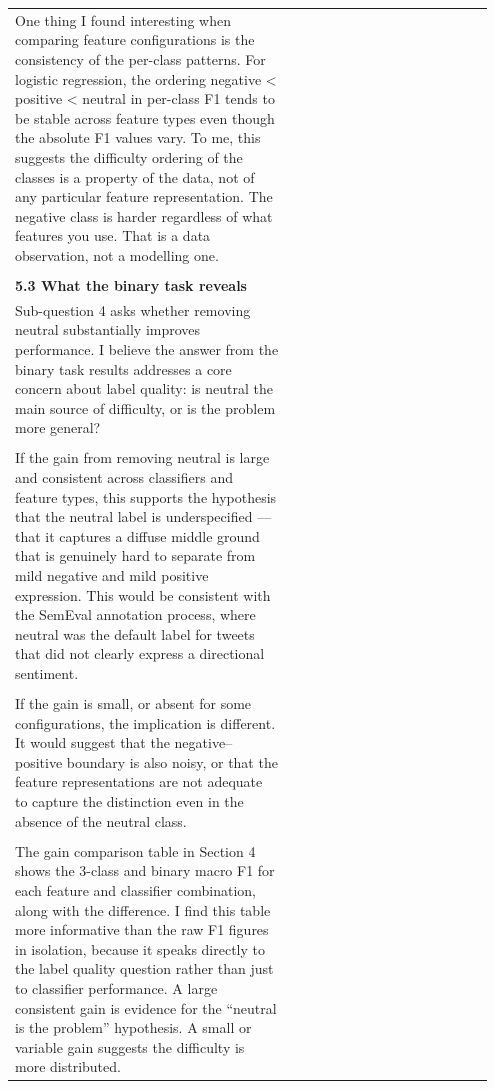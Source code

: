 \documentclass[11pt]{article}
\begin{document}
\begin{longtable}{|p{0.55\linewidth}|p{0.40\linewidth}|}
\hline
\rule{0pt}{3.5cm} & \\
\hline
One thing I found interesting when comparing feature configurations is the consistency of the per-class patterns. For logistic regression, the ordering negative < positive < neutral in per-class F1 tends to be stable across feature types even though the absolute F1 values vary. To me, this suggests the difficulty ordering of the classes is a property of the data, not of any particular feature representation. The negative class is harder regardless of what features you use. That is a data observation, not a modelling one. & \\[2pt]
\hline
\rule{0pt}{3.5cm} & \\
\hline
\multicolumn{2}{|l|}{\textbf{5.3 What the binary task reveals}} \\[2pt]
\hline
Sub-question 4 asks whether removing neutral substantially improves performance. I believe the answer from the binary task results addresses a core concern about label quality: is neutral the main source of difficulty, or is the problem more general? & \\[2pt]
\hline
\rule{0pt}{3.5cm} & \\
\hline
If the gain from removing neutral is large and consistent across classifiers and feature types, this supports the hypothesis that the neutral label is underspecified --- that it captures a diffuse middle ground that is genuinely hard to separate from mild negative and mild positive expression. This would be consistent with the SemEval annotation process, where neutral was the default label for tweets that did not clearly express a directional sentiment. & \\[2pt]
\hline
\rule{0pt}{3.5cm} & \\
\hline
If the gain is small, or absent for some configurations, the implication is different. It would suggest that the negative--positive boundary is also noisy, or that the feature representations are not adequate to capture the distinction even in the absence of the neutral class. & \\[2pt]
\hline
\rule{0pt}{3.5cm} & \\
\hline
The gain comparison table in Section 4 shows the 3-class and binary macro F1 for each feature and classifier combination, along with the difference. I find this table more informative than the raw F1 figures in isolation, because it speaks directly to the label quality question rather than just to classifier performance. A large consistent gain is evidence for the ``neutral is the problem'' hypothesis. A small or variable gain suggests the difficulty is more distributed. & \\[2pt]

\end{longtable}
\end{document}
